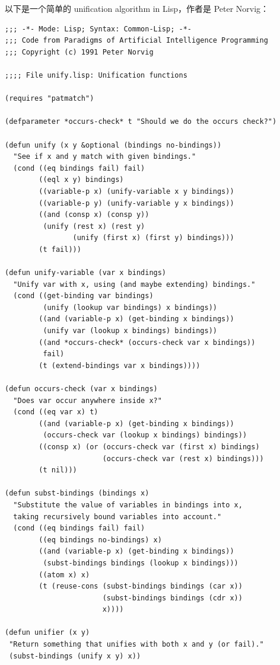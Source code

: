 \documentclass[12pt, orivec]{article}
\newcommand{\cc}[2]{#1}
\newcommand{\cc}[2]{#2}
\begin{document}
\cc{以下是一个简单的 unification algorithm in Lisp，作者是 Peter Norvig： 
}{
The following is a simple unification algorithm in Lisp by Peter Norvig:
}
\begin{tcolorbox}[breakable]
\footnotesize
\ttfamily
\begin{verbatim}
;;; -*- Mode: Lisp; Syntax: Common-Lisp; -*-
;;; Code from Paradigms of Artificial Intelligence Programming
;;; Copyright (c) 1991 Peter Norvig

;;;; File unify.lisp: Unification functions

(requires "patmatch")

(defparameter *occurs-check* t "Should we do the occurs check?")

(defun unify (x y &optional (bindings no-bindings))
  "See if x and y match with given bindings."
  (cond ((eq bindings fail) fail)
        ((eql x y) bindings)
        ((variable-p x) (unify-variable x y bindings))
        ((variable-p y) (unify-variable y x bindings))
        ((and (consp x) (consp y))
         (unify (rest x) (rest y) 
                (unify (first x) (first y) bindings)))
        (t fail)))

(defun unify-variable (var x bindings)
  "Unify var with x, using (and maybe extending) bindings."
  (cond ((get-binding var bindings)
         (unify (lookup var bindings) x bindings))
        ((and (variable-p x) (get-binding x bindings))
         (unify var (lookup x bindings) bindings))
        ((and *occurs-check* (occurs-check var x bindings))
         fail)
        (t (extend-bindings var x bindings))))

(defun occurs-check (var x bindings)
  "Does var occur anywhere inside x?"
  (cond ((eq var x) t)
        ((and (variable-p x) (get-binding x bindings))
         (occurs-check var (lookup x bindings) bindings))
        ((consp x) (or (occurs-check var (first x) bindings)
                       (occurs-check var (rest x) bindings)))
        (t nil)))

(defun subst-bindings (bindings x)
  "Substitute the value of variables in bindings into x,
  taking recursively bound variables into account."
  (cond ((eq bindings fail) fail)
        ((eq bindings no-bindings) x)
        ((and (variable-p x) (get-binding x bindings))
         (subst-bindings bindings (lookup x bindings)))
        ((atom x) x)
        (t (reuse-cons (subst-bindings bindings (car x))
                       (subst-bindings bindings (cdr x))
                       x))))

(defun unifier (x y)
 "Return something that unifies with both x and y (or fail)."
 (subst-bindings (unify x y) x))
\end{verbatim}
\normalsize
\rmfamily
\end{tcolorbox}
\end{document}
